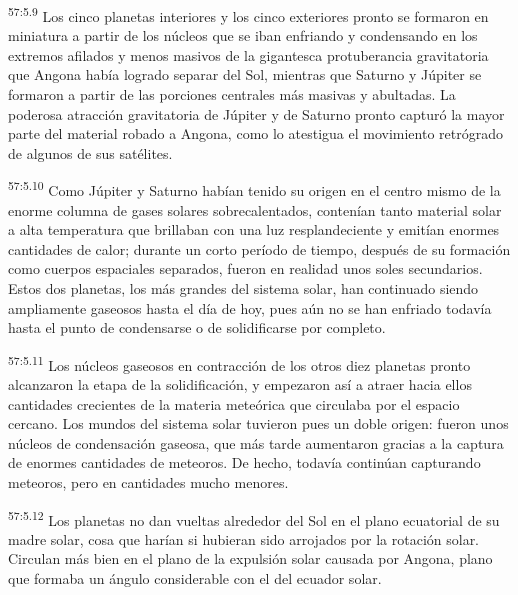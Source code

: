 \par
\textsuperscript{57:5.9} Los cinco planetas interiores y los cinco exteriores pronto se formaron en miniatura a partir de los núcleos que se iban enfriando y condensando en los extremos afilados y menos masivos de la gigantesca protuberancia gravitatoria que Angona había logrado separar del Sol, mientras que Saturno y Júpiter se formaron a partir de las porciones centrales más masivas y abultadas. La poderosa atracción gravitatoria de Júpiter y de Saturno pronto capturó la mayor parte del material robado a Angona, como lo atestigua el movimiento retrógrado de algunos de sus satélites.

\par
\textsuperscript{57:5.10} Como Júpiter y Saturno habían tenido su origen en el centro mismo de la enorme columna de gases solares sobrecalentados, contenían tanto material solar a alta temperatura que brillaban con una luz resplandeciente y emitían enormes cantidades de calor; durante un corto período de tiempo, después de su formación como cuerpos espaciales separados, fueron en realidad unos soles secundarios. Estos dos planetas, los más grandes del sistema solar, han continuado siendo ampliamente gaseosos hasta el día de hoy, pues aún no se han enfriado todavía hasta el punto de condensarse o de solidificarse por completo.

\par
\textsuperscript{57:5.11} Los núcleos gaseosos en contracción de los otros diez planetas pronto alcanzaron la etapa de la solidificación, y empezaron así a atraer hacia ellos cantidades crecientes de la materia meteórica que circulaba por el espacio cercano. Los mundos del sistema solar tuvieron pues un doble origen: fueron unos núcleos de condensación gaseosa, que más tarde aumentaron gracias a la captura de enormes cantidades de meteoros. De hecho, todavía continúan capturando meteoros, pero en cantidades mucho menores.

\par
\textsuperscript{57:5.12} Los planetas no dan vueltas alrededor del Sol en el plano ecuatorial de su madre solar, cosa que harían si hubieran sido arrojados por la rotación solar. Circulan más bien en el plano de la expulsión solar causada por Angona, plano que formaba un ángulo considerable con el del ecuador solar.

